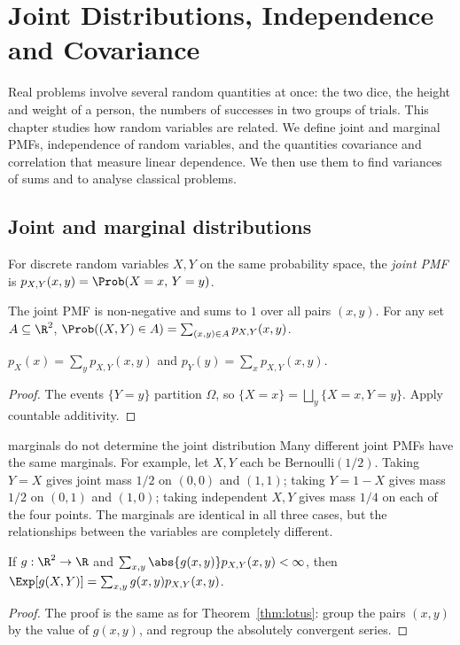 \chapter{Joint Distributions, Independence and Covariance}
\label{ch:joint}

Real problems involve several random quantities at once: the two dice, the
height and weight of a person, the numbers of successes in two groups of trials.
This chapter studies how random variables are related. We define joint and
marginal PMFs, independence of random variables, and the quantities covariance
and correlation that measure linear dependence. We then use them to find
variances of sums and to analyse classical problems.

\section{Joint and marginal distributions}

\begin{definition}
For discrete random variables $X,Y$ on the same probability space, the
\emph{joint PMF} is $p_{X,Y}(x,y)=\Prob(X=x,\,Y=y)$.
\end{definition}

The joint PMF is non-negative and sums to $1$ over all pairs $(x,y)$. For any
set $A\subseteq\R^2$, $\Prob((X,Y)\in A)=\sum_{(x,y)\in A}p_{X,Y}(x,y)$.

\begin{proposition}[Marginals]
$p_X(x)=\sum_yp_{X,Y}(x,y)$ and $p_Y(y)=\sum_xp_{X,Y}(x,y)$.
\end{proposition}
\begin{proof}
The events $\{Y=y\}$ partition $\Omega$, so $\{X=x\}=\bigsqcup_y\{X=x,Y=y\}$.
Apply countable additivity.
\end{proof}

\begin{nuance}{marginals do not determine the joint distribution}
Many different joint PMFs have the same marginals. For example, let $X,Y$ each be
Bernoulli$(1/2)$. Taking $Y=X$ gives joint mass $1/2$ on $(0,0)$ and $(1,1)$;
taking $Y=1-X$ gives mass $1/2$ on $(0,1)$ and $(1,0)$; taking independent
$X,Y$ gives mass $1/4$ on each of the four points. The marginals are identical in
all three cases, but the relationships between the variables are completely
different.
\end{nuance}

\begin{theorem}\label{thm:lotus2}
If $g:\R^2\to\R$ and $\sum_{x,y}\abs{g(x,y)}p_{X,Y}(x,y)<\infty$, then
$\Exp[g(X,Y)]=\sum_{x,y}g(x,y)p_{X,Y}(x,y)$.
\end{theorem}
\begin{proof}
The proof is the same as for Theorem~\ref{thm:lotus}: group the pairs $(x,y)$
by the value of $g(x,y)$, and regroup the absolutely convergent series.
\end{proof}

